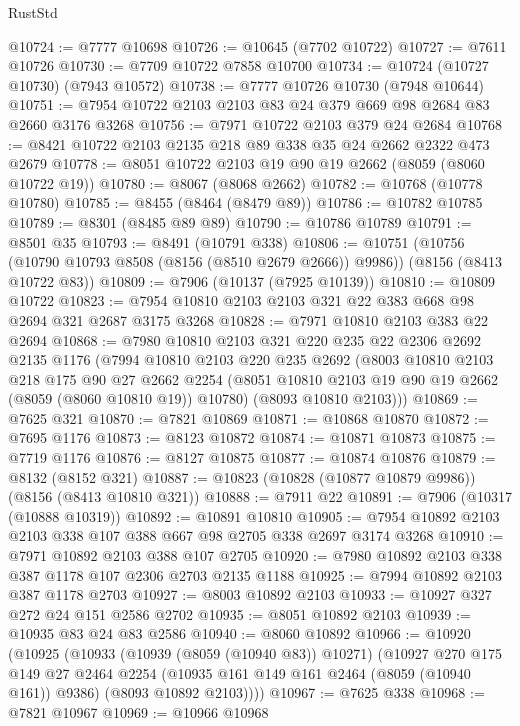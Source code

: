\begin{lexlean}{RustStd}
\begin{coremodule}
{\begin{coremodule}
{{{{{{{{{{{{{{{{{{{{{{{{{{{{{{{{{{@10724 := @7777 @10698
@10726 := @10645 (@7702 @10722)
@10727 := @7611 @10726
@10730 := @7709 @10722 @7858 @10700
@10734 := @10724 (@10727 @10730) (@7943 @10572)
@10738 := @7777 @10726 @10730 (@7948 @10644)
@10751 := @7954 @10722 @2103 @2103 @83 @24 @379 @669 @98 @2684 @83 @2660 @3176 @3268
@10756 := @7971 @10722 @2103 @379 @24 @2684
@10768 := @8421 @10722 @2103 @2135 @218 @89 @338 @35 @24 @2662 @2322 @473 @2679
@10778 := @8051 @10722 @2103 @19 @90 @19 @2662 (@8059 (@8060 @10722 @19))
@10780 := @8067 (@8068 @2662)
@10782 := @10768 (@10778 @10780)
@10785 := @8455 (@8464 (@8479 @89))
@10786 := @10782 @10785
@10789 := @8301 (@8485 @89 @89)
@10790 := @10786 @10789
@10791 := @8501 @35
@10793 := @8491 (@10791 @338)
@10806 := @10751
    (@10756 (@10790 @10793 @8508 (@8156 (@8510 @2679 @2666)) @9986))
    (@8156 (@8413 @10722 @83))
@10809 := @7906 (@10137 (@7925 @10139))
@10810 := @10809 @10722
@10823 := @7954 @10810 @2103 @2103 @321 @22 @383 @668 @98 @2694 @321 @2687 @3175 @3268
@10828 := @7971 @10810 @2103 @383 @22 @2694
@10868 := @7980
    @10810
    @2103
    @321
    @220
    @235
    @22
    @2306
    @2692
    @2135
    @1176
    (@7994
      @10810
      @2103
      @220
      @235
      @2692
      (@8003
        @10810
        @2103
        @218
        @175
        @90
        @27
        @2662
        @2254
        (@8051 @10810 @2103 @19 @90 @19 @2662 (@8059 (@8060 @10810 @19)) @10780)
        (@8093 @10810 @2103)))
@10869 := @7625 @321
@10870 := @7821 @10869
@10871 := @10868 @10870
@10872 := @7695 @1176
@10873 := @8123 @10872
@10874 := @10871 @10873
@10875 := @7719 @1176
@10876 := @8127 @10875
@10877 := @10874 @10876
@10879 := @8132 (@8152 @321)
@10887 := @10823 (@10828 (@10877 @10879 @9986)) (@8156 (@8413 @10810 @321))
@10888 := @7911 @22
@10891 := @7906 (@10317 (@10888 @10319))
@10892 := @10891 @10810
@10905 := @7954 @10892 @2103 @2103 @338 @107 @388 @667 @98 @2705 @338 @2697 @3174 @3268
@10910 := @7971 @10892 @2103 @388 @107 @2705
@10920 := @7980 @10892 @2103 @338 @387 @1178 @107 @2306 @2703 @2135 @1188
@10925 := @7994 @10892 @2103 @387 @1178 @2703
@10927 := @8003 @10892 @2103
@10933 := @10927 @327 @272 @24 @151 @2586 @2702
@10935 := @8051 @10892 @2103
@10939 := @10935 @83 @24 @83 @2586
@10940 := @8060 @10892
@10966 := @10920
    (@10925
      (@10933
        (@10939 (@8059 (@10940 @83)) @10271)
        (@10927
          @270
          @175
          @149
          @27
          @2464
          @2254
          (@10935 @161 @149 @161 @2464 (@8059 (@10940 @161)) @9386)
          (@8093 @10892 @2103))))
@10967 := @7625 @338
@10968 := @7821 @10967
@10969 := @10966 @10968
}}}}}}}}}}}}}}}}}}}}}}}}}}}}}}}}}}
\end{coremodule}}
\end{coremodule}
\end{lexlean}
